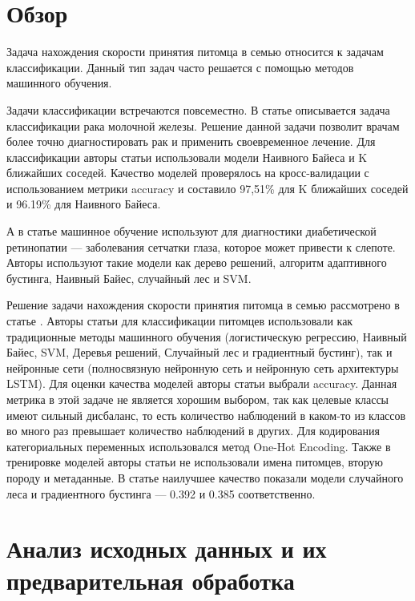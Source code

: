 \documentclass[14pt]{mmcs_article}
\begin{document}
\newpage
{}
\section*{Обзор}

Задача нахождения скорости принятия питомца в семью относится к задачам классификации. Данный тип задач часто решается с помощью методов машинного обучения. 
 
Задачи классификации встречаются повсеместно. В статье \cite{lib:obz1} описывается задача классификации рака молочной железы. Решение данной задачи позволит врачам более точно диагностировать рак и применить своевременное лечение. Для классификации авторы статьи использовали модели Наивного Байеса и K ближайших соседей. Качество моделей проверялось на кросс-валидации с использованием метрики accuracy и составило 97,51\% для K ближайших соседей и 96.19\% для Наивного Байеса.

А в статье \cite{lib:obz2} машинное обучение используют для диагностики диабетической ретинопатии — заболевания сетчатки глаза, которое может привести к слепоте. Авторы используют такие модели как дерево решений, алгоритм адаптивного бустинга, Наивный Байес, случайный лес и SVM.

Решение задачи нахождения скорости принятия питомца в семью рассмотрено в статье \cite{lib:obz3}. Авторы статьи для классификации питомцев использовали как традиционные методы машинного обучения (логистическую регрессию, Наивный Байес, SVM, Деревья решений, Случайный лес и градиентный бустинг), так и нейронные сети (полносвязную нейронную сеть и нейронную сеть архитектуры LSTM). Для оценки качества моделей авторы статьи выбрали accuracy. Данная метрика в этой задаче не является хорошим выбором, так как целевые классы имеют сильный дисбаланс, то есть количество наблюдений в каком-то из классов во много раз превышает количество наблюдений в других. Для кодирования категориальных переменных использовался метод One-Hot Encoding. Также в тренировке моделей авторы статьи не использовали имена питомцев, вторую породу и метаданные. В статье наилучшее качество показали модели случайного леса и градиентного бустинга — 0.392 и 0.385 соответственно.


\newpage
\section{Анализ исходных данных и их предварительная обработка}
\end{document}
